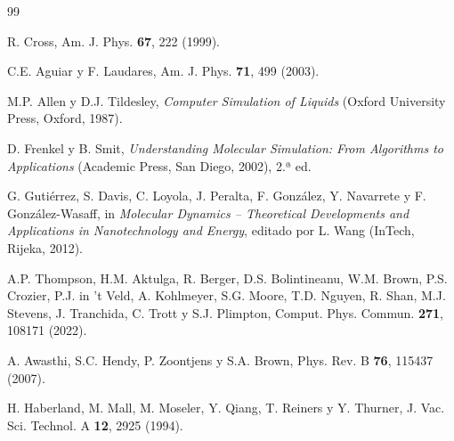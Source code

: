 \documentclass[10pt,a4paper,twocolumn]{article}
\begin{document}
\begin{thebibliography}{99}

R. Cross, Am. J. Phys. \textbf{67}, 222 (1999).

C.E. Aguiar y F. Laudares, Am. J. Phys. \textbf{71}, 499 (2003).

M.P. Allen y D.J. Tildesley, \textit{Computer Simulation of Liquids}
(Oxford University Press, Oxford, 1987).

D. Frenkel y B. Smit, \textit{Understanding Molecular Simulation: From
Algorithms to Applications} (Academic Press, San Diego, 2002), 2.ª ed.

G. Gutiérrez, S. Davis, C. Loyola, J. Peralta, F. González, Y. Navarrete
y F. González-Wasaff, in \textit{Molecular Dynamics -- Theoretical
Developments and Applications in Nanotechnology and Energy}, editado por
L. Wang (InTech, Rijeka, 2012).

A.P. Thompson, H.M. Aktulga, R. Berger, D.S. Bolintineanu, W.M. Brown,
P.S. Crozier, P.J. in 't Veld, A. Kohlmeyer, S.G. Moore, T.D. Nguyen,
R. Shan, M.J. Stevens, J. Tranchida, C. Trott y S.J. Plimpton,
Comput. Phys. Commun. \textbf{271}, 108171 (2022).

A. Awasthi, S.C. Hendy, P. Zoontjens y S.A. Brown,
Phys. Rev. B \textbf{76}, 115437 (2007).

H. Haberland, M. Mall, M. Moseler, Y. Qiang, T. Reiners y Y. Thurner,
J. Vac. Sci. Technol. A \textbf{12}, 2925 (1994).

\end{thebibliography}
\end{document}
